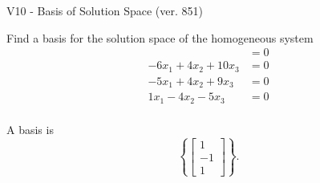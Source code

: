 \begin{exercise}
  \begin{exerciseTitle}V10 - Basis of Solution Space (ver. 851)\end{exerciseTitle}
  \begin{exerciseStatement}
    Find a basis for the solution space of the homogeneous system 
\begin{align*}
 &= 0  \\ 
 -6 x_ 1 + 4 x_ 2 + 10 x_ 3 &= 0  \\ 
  -5 x_ 1 + 4 x_ 2 + 9 x_ 3 &= 0  \\ 
  1 x_ 1 -4 x_ 2 -5 x_ 3 &= 0  \\ 
 \end{align*}


 
  \end{exerciseStatement}

  \begin{exerciseAnswer}
   A basis is   
\[\left\{\left[\begin{array}{c}
1 \\
-1 \\
1
\end{array}\right]\right\}.\]

  


  \end{exerciseAnswer}
\end{exercise}